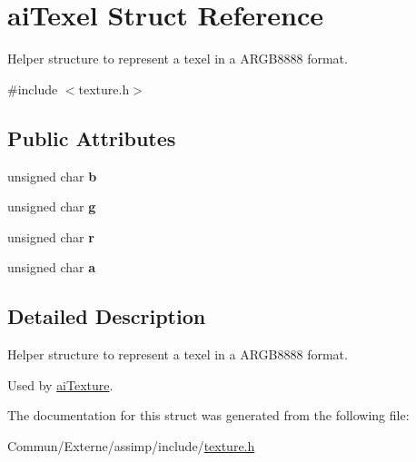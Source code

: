 \hypertarget{structai_texel}{}\section{ai\+Texel Struct Reference}
\label{structai_texel}


Helper structure to represent a texel in a A\+R\+G\+B8888 format.  




{\ttfamily \#include $<$texture.\+h$>$}

\subsection*{Public Attributes}
\begin{DoxyCompactItemize}
\item 
unsigned char {\bfseries b}\hypertarget{structai_texel_a5b4f97f69cf59cb9065af67389599ba6}{}\label{structai_texel_a5b4f97f69cf59cb9065af67389599ba6}

\item 
unsigned char {\bfseries g}\hypertarget{structai_texel_a41da3516b8241165e4ca58ea8ed68fe6}{}\label{structai_texel_a41da3516b8241165e4ca58ea8ed68fe6}

\item 
unsigned char {\bfseries r}\hypertarget{structai_texel_ae9408c0d18f6ff597715cc626398a0ff}{}\label{structai_texel_ae9408c0d18f6ff597715cc626398a0ff}

\item 
unsigned char {\bfseries a}\hypertarget{structai_texel_a6d4450e83b02b29d24f7aab27958034e}{}\label{structai_texel_a6d4450e83b02b29d24f7aab27958034e}

\end{DoxyCompactItemize}


\subsection{Detailed Description}
Helper structure to represent a texel in a A\+R\+G\+B8888 format. 

Used by \hyperlink{structai_texture}{ai\+Texture}. 

The documentation for this struct was generated from the following file\+:\begin{DoxyCompactItemize}
\item 
Commun/\+Externe/assimp/include/\hyperlink{texture_8h}{texture.\+h}\end{DoxyCompactItemize}
